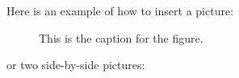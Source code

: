 \documentclass[a4paper]{article}
\theoremstyle{definition}
\numberwithin{equation}{section}
\begin{document}
Here is an example of how to insert a picture:

\begin{figure}[!ht]
\centering
{}
\caption{This is the caption for the figure.}
\label{fig:Pict}
\end{figure}

or two side-by-side pictures:
\end{document}
